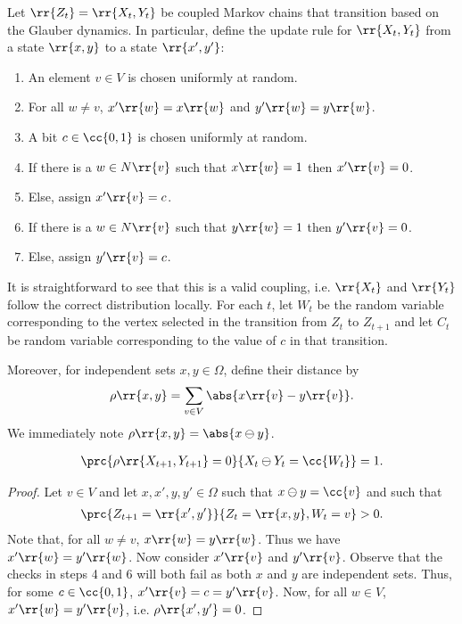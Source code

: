 \documentclass{article}
\begin{document}
Let $\rr{Z_t}=\rr{X_t,Y_t}$ be coupled Markov chains that transition
based on the Glauber dynamics. In particular, define the update rule for $\rr{X_t,Y_t}$
from a state $\rr{x,y}$ to a state $\rr{x',y'}$:
\begin{enumerate}
  \item An element $v\in V$ is chosen uniformly at random.
  \item For all $w\neq v$, $x'\rr{w}=x\rr{w}$ and $y'\rr{w}=y\rr{w}$.
  \item A bit $c\in\cc{0,1}$ is chosen uniformly at random.
  \item If there is a $w\in N\rr{v}$ such that $x\rr{w}=1$ then $x'\rr{v}=0$.
  \item Else, assign $x'\rr{v}=c$.
  \item If there is a $w\in N\rr{v}$ such that $y\rr{w}=1$ then $y'\rr{v}=0$.
  \item Else, assign $y'\rr{v}=c$.
\end{enumerate}
It is straightforward to see that this is a valid coupling, i.e. $\rr{X_t}$ and $\rr{Y_t}$
follow the correct distribution locally. For each $t$, let $W_t$ be the random variable
corresponding to the vertex selected in the transition from $Z_t$ to $Z_{t+1}$ and let
$C_t$ be random variable corresponding to the value of $c$ in that transition.

Moreover, for independent sets $x,y\in\Omega$, define their distance by
\begin{align*}
  \rho\rr{x,y} = \sum_{v\in V} \abs{x\rr{v}-y\rr{v}}.
\end{align*}
We immediately note $\rho\rr{x,y}=\abs{x\ominus y}$.

\begin{claim*}[3a]
  \begin{align*}
    \prc{\rho\rr{X_{t+1},Y_{t+1}}=0}{X_t\ominus Y_t=\cc{W_t}}=1.
  \end{align*}
  \begin{proof}
    Let $v\in V$ and let $x,x',y,y'\in\Omega$ such that $x\ominus y=\cc{v}$ and such that
    \begin{align*}
      \prc{Z_{t+1}=\rr{x',y'}}{Z_t=\rr{x,y},W_t=v}>0.
    \end{align*}
    Note that, for all $w\neq v$, $x\rr{w}=y\rr{w}$. Thus we have $x'\rr{w}=y'\rr{w}$.
    Now consider $x'\rr{v}$ and $y'\rr{v}$. Observe that the checks in steps 4 and 6 will
    both fail as both $x$ and $y$ are independent sets. Thus, for some $c\in\cc{0,1}$,
    $x'\rr{v}=c=y'\rr{v}$. Now, for all $w\in V$, $x'\rr{w}=y'\rr{v}$, i.e. $\rho\rr{x',y'}=0$.
  \end{proof}
\end{claim*}
\end{document}
